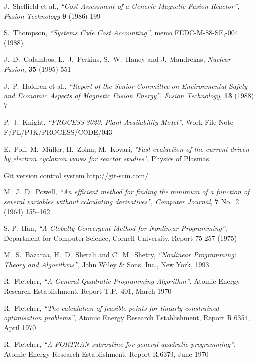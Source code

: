 \documentclass[11pt,a4paper]{report}
\begin{document}
\begin{thebibliography}{99}
J.\ Sheffield et al.,
\textit{``Cost Assessment of a Generic Magnetic Fusion Reactor''},
\textit{Fusion Technology} \textbf{9} (1986) 199

S.\ Thompson,
\textit{``Systems Code Cost Accounting''},
memo FEDC-M-88-SE,-004 (1988)

J.\ D.\ Galambos, L.\ J.\ Perkins, S.\ W.\ Haney and J.\ Mandrekas,
\textit{Nuclear Fusion}, \textbf{35} (1995) 551

J.\ P.\ Holdren et al.,
\textit{``Report of the Senior Committee on Environmental Safety and
Economic Aspects of Magnetic Fusion Energy''},
\textit{Fusion Technology}, \textbf{13} (1988) 7

P.\ J.\ Knight,
\textit{``PROCESS 3020: Plant Availability Model''},
Work File Note F/PL/PJK/PROCESS/CODE/043

E.\ Poli, M.\ M\"{u}ller, H.\ Zohm, M.\ Kovari,
\textit{"Fast evaluation of the current driven by electron cyclotron waves for reactor studies"},   
Physics of Plasmas,

\href{http://git-scm.com/}{Git version control system}
\url{http://git-scm.com/}

M.\ J.\ D.\ Powell,
\textit{``An efficient method for finding the minimum of a function of several
  variables without calculating derivatives''}, 
\textit{Computer Journal}, \textbf{7} No.\ 2 (1964) 155--162

S.-P.\ Han,
\textit{``A Globally Convergent Method for Nonlinear Programming''},
Department for Computer Science, Cornell University, Report 75-257 (1975)

M.\ S.\ Bazaraa, H.\ D.\ Sherali and C.\ M.\ Shetty,
\textit{``Nonlinear Programming: Theory and Algorithms''},
John Wiley \& Sons, Inc., New York, 1993

R.\ Fletcher,
\textit{``A General Quadratic Programming Algorithm''},
Atomic Energy Research Establishment, Report T.P.~401, March 1970

R.\ Fletcher,
\textit{``The calculation of feasible points for linearly constrained
  optimisation problems''},
Atomic Energy Research Establishment, Report R.6354, April 1970

R.\ Fletcher,
\textit{``A FORTRAN subroutine for general quadratic programming''},
Atomic Energy Research Establishment, Report R.6370, June 1970


\end{thebibliography}
\end{document}
